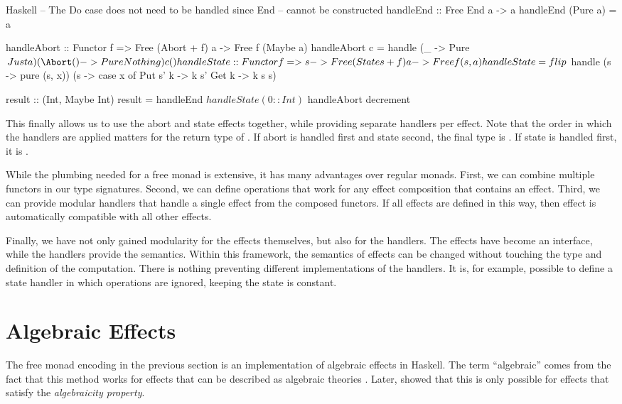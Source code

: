 \begin{lst}{Haskell}
-- The Do case does not need to be handled since End
-- cannot be constructed
handleEnd :: Free End a -> a
handleEnd (Pure a) = a

handleAbort :: Functor f => Free (Abort + f) a -> Free f (Maybe a)
handleAbort c = handle
  (\a _ -> Pure $ Just a)
  (\Abort () -> Pure Nothing) 
  c ()
  
handleState :: Functor f => s -> Free (State s + f) a -> Free f (s, a)
handleState = flip $ handle
  (\x s -> pure (s, x))
  (\x s -> case x of
      Put s' k -> k s'
      Get k -> k s s)

result :: (Int, Maybe Int)
result = handleEnd $ handleState (0::Int) $ handleAbort decrement  
\end{lst}
%
This finally allows us to use the abort and state effects together, while providing separate handlers per effect. Note that the order in which the handlers are applied matters for the return type of . If abort is handled first and state second, the final type is . If state is handled first, it is .

While the plumbing needed for a free monad is extensive, it has many advantages over regular monads. First, we can combine multiple functors in our type signatures. Second, we can define operations that work for any effect composition that contains an effect. Third, we can provide modular handlers that handle a single effect from the composed functors. If all effects are defined in this way, then effect is automatically compatible with all other effects.

Finally, we have not only gained modularity for the effects themselves, but also for the handlers. The effects have become an interface, while the handlers provide the semantics. Within this framework, the semantics of effects can be changed without touching the type and definition of the computation. There is nothing preventing different implementations of the handlers. It is, for example, possible to define a state handler in which  operations are ignored, keeping the state is constant.

\section{Algebraic Effects}

The free monad encoding in the previous section is an implementation of algebraic effects in Haskell. The term ``algebraic'' comes from the fact that this method works for effects that can be described as algebraic theories \autocite{goos_adequacy_2001}. Later, \textcite{plotkin_algebraic_2003} showed that this is only possible for effects that satisfy the \emph{algebraicity property}.

